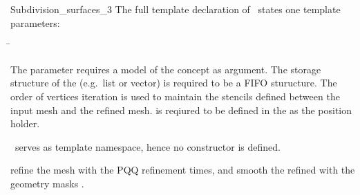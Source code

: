 \begin{ccRefClass}{Subdivision_surfaces_3}
The full template declaration of \ccClassTemplateName\ states one
template parameters:

\begin{tabbing}
 \=\\
\end{tabbing}
   
The  parameter requires a model of 
the  concept as argument. The storage structure
of the  (e.g.~list or vector) is required to be a
FIFO sturucture. The order of vertices iteration is used
to maintain the stencils defined between the input mesh and the refined
mesh.  is reqiured to be defined in the 
as the position holder.








\ccCreation

\ccClassTemplateName\ serves as template namespace, hence no constructor
is defined. 




\ccThree{}{}{}
{refine the mesh  with the PQQ refinement
 times, and smooth the refined  with the geometry 
masks .}


\end{ccRefClass}
